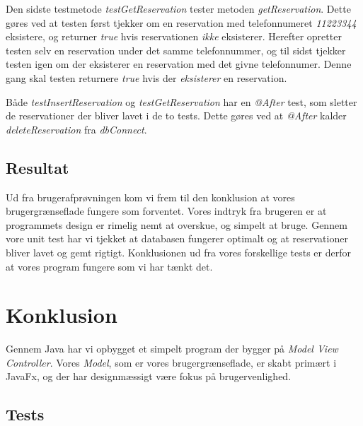 \documentclass[final]{report}
\begin{document}
Den sidste testmetode \emph{testGetReservation} tester metoden \emph{getReservation}. Dette gøres ved at testen først tjekker om en reservation med telefonnumeret \emph{11223344} eksistere, og returner \emph{true} hvis reservationen \emph{ikke} eksisterer. Herefter opretter testen selv en reservation under det samme telefonnummer, og til sidst tjekker testen igen om der eksisterer en reservation med det givne telefonnumer. Denne gang skal testen returnere \emph{true} hvis der \emph{eksisterer} en reservation. 

Både \emph{testInsertReservation} og \emph{testGetReservation} har en \emph{@After} test, som sletter de reservationer der bliver lavet i de to tests. Dette gøres ved at \emph{@After} kalder \emph{deleteReservation} fra \emph{dbConnect}.


\section{Resultat}
Ud fra brugerafprøvningen kom vi frem til den konklusion at vores brugergrænseflade fungere som forventet. Vores indtryk fra brugeren er at programmets design er rimelig nemt at overskue, og simpelt at bruge. Gennem vore unit test har vi tjekket at databasen fungerer optimalt og at reservationer bliver lavet og gemt rigtigt. Konklusionen ud fra vores forskellige tests er derfor at vores program fungere som vi har tænkt det. 

\chapter{Konklusion}
Gennem Java har vi opbygget et simpelt program der bygger på \emph{Model View Controller}. Vores \emph{Model}, som er vores brugergrænseflade, er skabt primært i JavaFx, og der har designmæssigt \cite{oracle} være fokus på \cite{Java} brugervenlighed. 






\listoffigures

\begin{appendix}

\chapter{Tests}
\inputminted{java}{../src/test/DBConnectTest.java}

\end{appendix}
\end{document}
